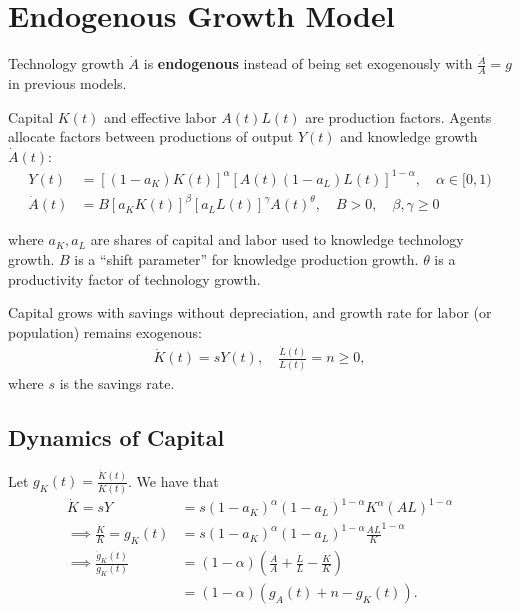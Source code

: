 \documentclass[../main.tex]{subfiles}
\begin{document}
    
    \chapter{Endogenous Growth Model}
        
        Technology growth $\dot A$ is \textbf{endogenous} instead of being set exogenously with $\frac{\dot A}{A} = g$ in previous models.
        
        \vspace{0.5cm}
        
        Capital $K(t)$ and effective labor $A(t)L(t)$ are production factors. Agents allocate factors between productions of output $Y(t)$ and knowledge growth $\dot A(t)$:
        \begin{align}
            Y(t)
            &= [(1-a_K) K(t)]^\alpha [A(t) (1-a_L) L(t)]^{1-\alpha},
            \quad \alpha \in [0, 1)
            \\
            \dot A(t)
            &= B [a_K K(t)]^\beta [a_L L(t)]^\gamma A(t)^\theta,
            \quad B > 0, \quad \beta, \gamma \ge 0
        \end{align}
        
        where $a_K, a_L$ are shares of capital and labor used to knowledge technology growth. $B$ is a ``shift parameter'' for knowledge production growth. $\theta$ is a productivity factor of technology growth.
        
        \vspace{0.5cm}
        
        Capital grows with savings without depreciation, and growth rate for labor (or population) remains exogenous:
        \begin{align}
            \dot K(t) = s Y(t),\quad
            \frac{\dot L(t)}{L(t)} = n \ge 0,
        \end{align}
        where $s$ is the savings rate.
        
    \section{Dynamics of Capital}
        
        Let $g_K(t) = \frac{\dot K(t)}{K(t)}$. We have that
        \begin{align}
            \dot K
            = s Y
            &=
            s (1-a_K)^\alpha (1-a_L)^{1-\alpha} K^\alpha (AL)^{1-\alpha}
            \\
            \implies
            \frac{\dot K}{K} = g_K(t)
            &= s (1-a_K)^\alpha (1-a_L)^{1-\alpha} \frac{AL}{K}^{1-\alpha}
            \\
            \implies
            \frac{\dot g_K(t)}{g_K(t)}
            &= (1-\alpha)
            \left(\frac{\dot A}{A} + \frac{\dot L}{L} - \frac{\dot K}{K} \right)
            \\
            &= (1-\alpha)
            \left(g_A(t) + n - g_K(t) \right).
        \end{align}
        
\end{document}
